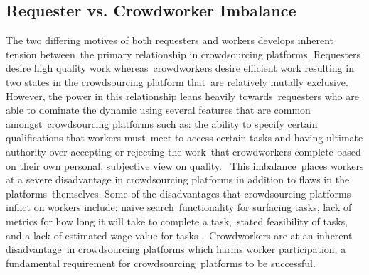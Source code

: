 \documentclass[letterpaper,12pt]{article}
\begin{document}
\subsection{Requester vs. Crowdworker Imbalance}
The two differing motives of both requesters and workers develops inherent tension between\
the primary relationship in crowdsourcing platforms. Requesters desire high quality work whereas\
crowdworkers desire efficient work resulting in two states in the crowdsourcing platform that\
are relatively mutally exclusive. However, the power in this relationship leans heavily towards\
requesters who are able to dominate the dynamic using several features that are common amongst\
crowdsourcing platforms such as: the ability to specify certain qualifications that workers must\
meet to access certain tasks and having ultimate authority over accepting or rejecting the work\
that crowdworkers complete based on their own personal, subjective view on quality. \cite{Kaplan2018,allahbakhsh2013quality}\
This imbalance\
places workers at a severe disadvantage in crowdsourcing platforms in addition to flaws in the platforms\
themselves. Some of the disadvantages that crowdsourcing platforms inflict on workers include: naive search\
functionality for surfacing tasks, lack of metrics for how long it will take to complete a task,\
stated feasibility of tasks, and a lack of estimated wage value for tasks \cite{Kaplan2018}.\
Crowdworkers are at an inherent disadvantage\
in crowdsourcing platforms which harms worker participation, a fundamental requirement for crowdsourcing\
platforms to be successful.
\end{document}
